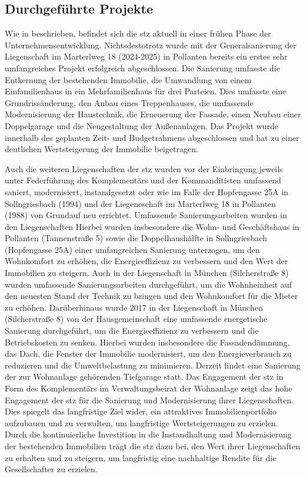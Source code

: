 \subsection{Durchgeführte Projekte}\label{subsec:DurchgeführteProjekte}

\par Wie in  beschrieben, befindet sich die \gls{stz} aktuell in einer frühen Phase der Unternehmensentwicklung. Nichtsdestotrotz wurde mit der Generalsanierung der Liegenschaft im Marterlweg 18 (2024-2025) in Pollanten bereits ein erstes sehr umfangreiches Projekt erfolgreich abgeschlossen. Die Sanierung umfasste die Entkernung der bestehenden Immobilie, die Umwandlung von einem Einfamilienhaus in ein Mehrfamilienhaus für drei Parteien. Dies umfasste eine Grundrissänderung, den Anbau eines Treppenhauses, die umfassende Modernisierung der Haustechnik, die Erneuerung der Fassade, einen Neubau einer Doppelgarage und die Neugestaltung der Außenanlagen. Das Projekt wurde innerhalb des geplanten Zeit- und Budgetrahmens abgeschlossen und hat zu einer deutlichen Wertsteigerung der Immobilie beigetragen.

\par Auch die weiteren Liegenschaften der \gls{stz} wurden vor der Einbringung jeweils unter Federführung des Komplementärs und der Kommanditisten umfassend saniert, modernisiert, instandgesetzt oder wie im Falle der Hopfengasse 25A in Sollngriesbach (1994) und der Liegeneschaft im Marterlweg 18 in Pollanten (1988) von Grundauf neu errichtet. Umfassende Sanierungsarbeiten wurden in den Liegenschaften  Hierbei wurden insbesondere die Wohn- und Geschäftshaus in Pollanten (Tannenstraße 5) sowie die Doppelhaushälfte in Sollngriesbach (Hopfengasse 25A) einer umfangreichen Sanierung unterzogen, um den Wohnkomfort zu erhöhen, die Energieeffizienz zu verbessern und den Wert der Immobilien zu steigern. Auch in der Liegenschaft in München (Silcherstraße 8) wurden umfassende Sanierungsarbeiten durchgeführt, um die Wohnheinheit auf den neuesten Stand der Technik zu bringen und den Wohnkomfort für die Mieter zu erhöhen. Darüberhinaus wurde 2017 in der Liegenschaft in München (Silcherstraße 8) von der Hausgemeinschaft eine umfassende energetische Sanierung durchgeführt, um die Energieeffizienz zu verbessern und die Betriebskosten zu senken. Hierbei wurden insbesondere die Fassadendämmung, das Dach, die Fenster der Immobilie modernisiert, um den Energieverbrauch zu reduzieren und die Umweltbelastung zu minimieren. Derzeit findet eine Sanierung der zur Wohnanlage gehörenden Tiefgarage statt. Das Engagement der \gls{stz} in Form des Komplementärs im Verwaltungsbeirat der Wohnanlage zeigt das hohe Engagement der \gls{stz} für  die Sanierung und Modernisierung ihrer Liegenschaften. Dies spiegelt das langfristige Ziel wider, ein attraktives Immobilienportfolio aufzubauen und zu verwalten, um langfristige Wertsteigerungen zu erzielen. Durch die kontinuierliche Investition in die Instandhaltung und Modernisierung der bestehenden Immobilien trägt die \gls{stz} dazu bei, den Wert ihrer Liegenschaften zu erhalten und zu steigern, um langfristig eine nachhaltige Rendite für die Gesellschafter zu erzielen.

